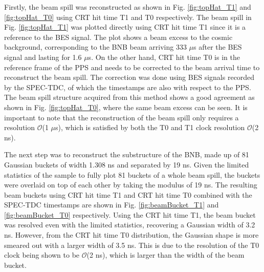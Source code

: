 Firstly, the beam spill was reconstructed as shown in Fig. \ref{fig:topHat_T1} and \ref{fig:topHat_T0} using CRT hit time T1 and T0 respectively.
The beam spill in Fig. \ref{fig:topHat_T1} was plotted directly using CRT hit time T1 since it is a reference to the BES signal.
The plot shows a beam excess to the cosmic background, corresponding to the BNB beam arriving 333 $\mu$s after the BES signal and lasting for 1.6 $\mu$s.
On the other hand, CRT hit time T0 is in the reference frame of the PPS and needs to be corrected to the beam arrival time to reconstruct the beam spill.
The correction was done using BES signals recorded by the SPEC-TDC, of which the timestamps are also with respect to the PPS. %
The beam spill structure acquired from this method shows a good agreement as shown in Fig. \ref{fig:topHat_T0}, where the same beam excess can be seen.
It is important to note that the reconstruction of the beam spill only requires a resolution $\mathcal{O}$(1 $\mu$s), which is satisfied by both the T0 and T1 clock resolution $\mathcal{O}$(2 ns).


The next step was to reconstruct the substructure of the BNB, made up of 81 Gaussian buckets of width 1.308 ns and separated by 19 ns.
Given the limited statistics of the sample to fully plot 81 buckets of a whole beam spill, the buckets were overlaid on top of each other by taking the modulus of 19 ns.
The resulting beam buckets using CRT hit time T1 and CRT hit time T0 combined with the SPEC-TDC timestamps are shown in Fig. \ref{fig:beamBucket_T1} and \ref{fig:beamBucket_T0} respectively.
Using the CRT hit time T1, the beam bucket was resolved even with the limited statistics, recovering a Gaussian width of 3.2 ns.
However, from the CRT hit time T0 distribution, the Gaussian shape is more smeared out with a larger width of 3.5 ns. 
This is due to the resolution of the T0 clock being shown to be $\mathcal{O}$(2 ns), which is larger than the width of the beam bucket.

